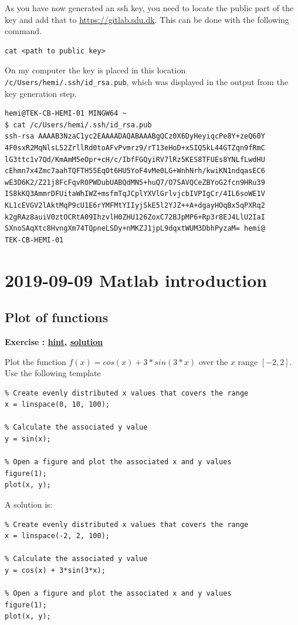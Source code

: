 \documentclass[12pt,a4paper]{article}
\makeatletter
\newcommand{\linkdest}[1]{\Hy@raisedlink{\hypertarget{#1}{}}}
\newcounter{ex}
\numberwithin{ex}{section}
\newenvironment{ex}[1][]{%
\filbreak
\bigskip
\refstepcounter{ex}
\noindent
\textbf{\linkdest{\theex{}exercise}{}Exercise \theex{}: #1\hfill\hyperlink{\theex{}hint}{hint}, \hyperlink{\theex{}solution}{solution}}\par\noindent}{}
\makeatother
\begin{document}
As you have now generated an ssh key, you need to locate the 
public part of the key and add that to \url{https://gitlab.sdu.dk}.
This can be done with the following command.
\begin{verbatim}
cat <path to public key>
\end{verbatim}

On my computer the key is placed in this location 
\verb!/c/Users/hemi/.ssh/id_rsa.pub!, which was displayed 
in the output from the key generation step.

\begin{verbatim}
hemi@TEK-CB-HEMI-01 MINGW64 ~
$ cat /c/Users/hemi/.ssh/id_rsa.pub
ssh-rsa AAAAB3NzaC1yc2EAAAADAQABAAABgQCz0X6DyHeyiqcPe8Y+zeQ60Y
4F0sxR2MqNlsL52ZrllRd0toAFvPvmrz9/rT13eHoD+xSIQ5kL44GTZqn9fRmC
lG3ttc1v7Qd/KmAmM5eOpr+cH/c/IbfFGQyiRV7lRz5KES8TFUEs8YNLfLwdHU
cEhmn7x4Zmc7aahTQFTH55EqOt6HU5YoF4vMe0LG+WnhNrh/kwiKN1ndqasEC6
wE3D6K2/Z21j8FcFqvR0PWDubUABQdMN5+huQ7/O7SAVQCeZBYoG2fcn9HRu39
IS8kKQ3AmmrDFUitaWhIWZ+msfmTqJCplYXVlGrlvjcbIVPIgCr/4IL6soWE1V
KL1cEVGV2lAktMqP9cU1E6rYMFMtYIIyjSkE5l2YJZ++A+dgayHOqBx5qPXRq2
k2gRAz8auiV0ztOCRtA09IhzvlH0ZHU126ZoxC72BJpMP6+Rp3r8EJ4LlU2IaI
SXnoSAqXtc8HvngXm74TQpneLSDy+nMKZJ1jpL9dqxtWUM3DbhPyzaM= hemi@
TEK-CB-HEMI-01
\end{verbatim}




\section{2019-09-09 Matlab introduction}


\subsection{Plot of functions}

\begin{ex}
Plot the function $f(x) = cos(x) + 3*sin(3*x)$
over the $x$ range $[-2, 2]$.
Use the following template 
\begin{lstlisting}
% Create evenly distributed x values that covers the range
x = linspace(0, 10, 100);

% Calculate the associated y value
y = sin(x);

% Open a figure and plot the associated x and y values
figure(1);
plot(x, y);
\end{lstlisting}
\begin{hint}
\end{hint}
\begin{sol}
A solution is:
\begin{lstlisting}
% Create evenly distributed x values that covers the range
x = linspace(-2, 2, 100);

% Calculate the associated y value
y = cos(x) + 3*sin(3*x);

% Open a figure and plot the associated x and y values
figure(1);
plot(x, y);
\end{lstlisting}
\end{sol}
\end{ex}
\end{document}
